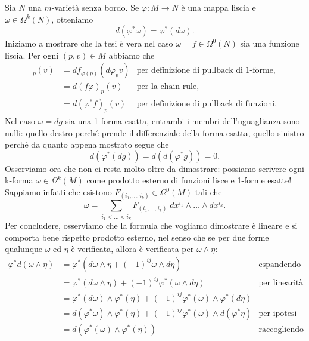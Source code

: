 \documentclass[a4paper]{article}
\begin{document}
\begin{ex}[6.4]{Sia $ N $ una $ m $-varietà senza bordo. Se $ \varphi\colon M \to N $ è una mappa
		liscia e $ \omega \in \Omega^k(N) $, otteniamo
		\[d(\varphi^\ast \omega) = \varphi^\ast(d\omega). \]}
	Iniziamo a mostrare che la tesi è vera nel caso $ \omega = f \in \Omega^0(N) $ sia una funzione liscia. Per ogni $ (p, v) \in M $ abbiamo che
	\begin{align*}
		[\varphi^*(df)]_p(v) &= df_{\varphi(p)}(d\varphi_p v) &\text{per definizione di pullback di 1-forme,}\\
		&= d(f\varphi)_p(v) &\text{per la chain rule,}\\
		&= d(\varphi^*f)_p(v) &\text{per definizione di pullback di funzioni}.
	\end{align*}
	Nel caso $\omega = dg$ sia una 1-forma esatta, entrambi i membri dell'uguaglianza sono nulli: quello destro perché prende il differenziale della forma esatta, quello sinistro perché da quanto appena mostrato segue che
	\[ d(\varphi^*(dg)) = d(d(\varphi^*g)) = 0. \]
	Osserviamo ora che non ci resta molto oltre da dimostrare: possiamo scrivere ogni k-forma $\omega \in \Omega^k(M)$ come prodotto esterno di funzioni lisce e 1-forme esatte! Sappiamo infatti che esistono $ F_{(i_1, \dots, i_k)} \in \Omega^0(M) $ tali che
	\[ \omega = \sum_{i_1 < \dots < i_k} F_{(i_1, \dots, i_k)} \; dx^{i_1} \wedge  \dots  \wedge dx^{i_k}. \]
	Per concludere, osserviamo che la formula che vogliamo dimostrare è lineare e si comporta bene rispetto prodotto esterno, nel senso che se per due forme qualunque $ \omega $ ed $ \eta $ è verificata, allora è verificata per $ \omega \wedge \eta $:
	\begin{align*}
		\varphi^*d(\omega \wedge \eta)
		&= \varphi^*\left(d\omega \wedge \eta + (-1)^{ij}\omega \wedge d\eta\right)
		& \text{espandendo il differenziale del prodotto,} \\
		&= \varphi^*\left(d\omega \wedge \eta\right) + (-1)^{ij}\varphi^*\left(\omega \wedge d\eta\right)
		& \text{per linearità del pullback,} \\
		&= \varphi^*(d\omega) \wedge \varphi^*(\eta) + (-1)^{ij}\varphi^*(\omega) \wedge \varphi^*(d\eta) & \\
		&= d(\varphi^*\omega) \wedge \varphi^*(\eta) + (-1)^{ij}\varphi^*(\omega) \wedge d(\varphi^*\eta) & \text{per ipotesi induttiva,} \\
		&= d\left(\varphi^*(\omega) \wedge \varphi^*(\eta)\right) & \text{raccogliendo il differenziale del prodotto.}
	\end{align*}
\end{ex}
\end{document}
